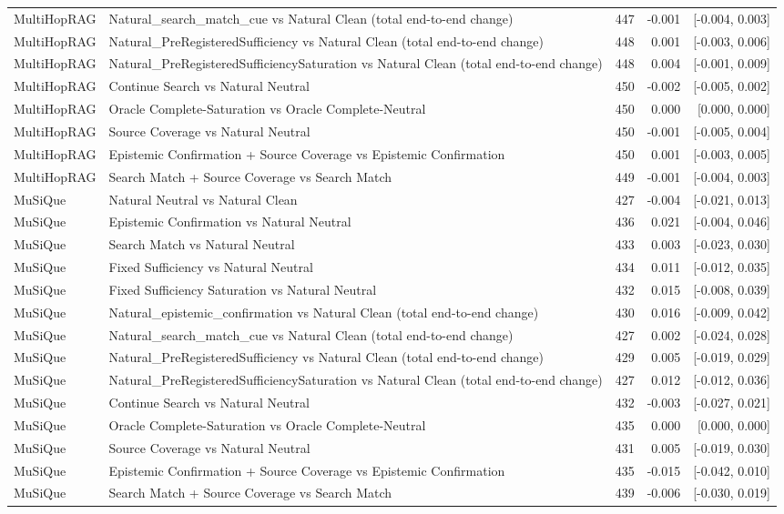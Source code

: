 \begin{table}[t]
\begin{tabular}{llrrr}
MultiHopRAG & Natural\_search\_match\_cue vs Natural Clean (total end-to-end change) & 447 & -0.001 & [-0.004, 0.003] \\
MultiHopRAG & Natural\_PreRegisteredSufficiency vs Natural Clean (total end-to-end change) & 448 & 0.001 & [-0.003, 0.006] \\
MultiHopRAG & Natural\_PreRegisteredSufficiencySaturation vs Natural Clean (total end-to-end change) & 448 & 0.004 & [-0.001, 0.009] \\
MultiHopRAG & Continue Search vs Natural Neutral & 450 & -0.002 & [-0.005, 0.002] \\
MultiHopRAG & Oracle Complete-Saturation vs Oracle Complete-Neutral & 450 & 0.000 & [0.000, 0.000] \\
MultiHopRAG & Source Coverage vs Natural Neutral & 450 & -0.001 & [-0.005, 0.004] \\
MultiHopRAG & Epistemic Confirmation + Source Coverage vs Epistemic Confirmation & 450 & 0.001 & [-0.003, 0.005] \\
MultiHopRAG & Search Match + Source Coverage vs Search Match & 449 & -0.001 & [-0.004, 0.003] \\
MuSiQue & Natural Neutral vs Natural Clean & 427 & -0.004 & [-0.021, 0.013] \\
MuSiQue & Epistemic Confirmation vs Natural Neutral & 436 & 0.021 & [-0.004, 0.046] \\
MuSiQue & Search Match vs Natural Neutral & 433 & 0.003 & [-0.023, 0.030] \\
MuSiQue & Fixed Sufficiency vs Natural Neutral & 434 & 0.011 & [-0.012, 0.035] \\
MuSiQue & Fixed Sufficiency Saturation vs Natural Neutral & 432 & 0.015 & [-0.008, 0.039] \\
MuSiQue & Natural\_epistemic\_confirmation vs Natural Clean (total end-to-end change) & 430 & 0.016 & [-0.009, 0.042] \\
MuSiQue & Natural\_search\_match\_cue vs Natural Clean (total end-to-end change) & 427 & 0.002 & [-0.024, 0.028] \\
MuSiQue & Natural\_PreRegisteredSufficiency vs Natural Clean (total end-to-end change) & 429 & 0.005 & [-0.019, 0.029] \\
MuSiQue & Natural\_PreRegisteredSufficiencySaturation vs Natural Clean (total end-to-end change) & 427 & 0.012 & [-0.012, 0.036] \\
MuSiQue & Continue Search vs Natural Neutral & 432 & -0.003 & [-0.027, 0.021] \\
MuSiQue & Oracle Complete-Saturation vs Oracle Complete-Neutral & 435 & 0.000 & [0.000, 0.000] \\
MuSiQue & Source Coverage vs Natural Neutral & 431 & 0.005 & [-0.019, 0.030] \\
MuSiQue & Epistemic Confirmation + Source Coverage vs Epistemic Confirmation & 435 & -0.015 & [-0.042, 0.010] \\
MuSiQue & Search Match + Source Coverage vs Search Match & 439 & -0.006 & [-0.030, 0.019] \\
\bottomrule
\end{tabular}
\end{table}

